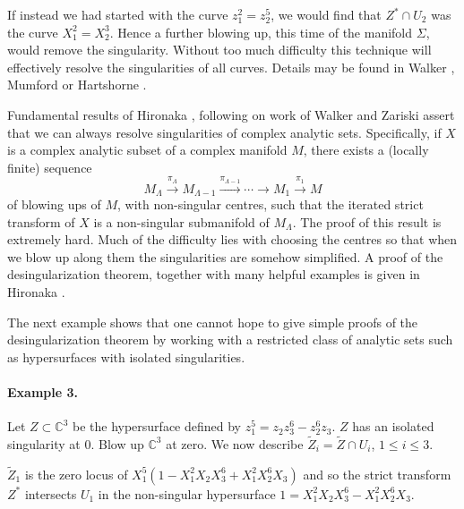 \begin{center}
    \begin{minipage}{\linewidth}
        \centering
        
    \end{minipage}
\end{center}

If instead we had started with the curve $z_1^2=z_2^5$, we would find that $Z^*\cap U_2$ was the curve $X_1^2=X_2^3$. Hence a further blowing up, this time of the manifold $\Sigma$, would remove the singularity. Without too much difficulty this technique will effectively resolve the singularities of all curves. Details may be found in Walker \cite{bib:I:walker-r:1}, Mumford \cite{bib:I:mumford-d:1} or Hartshorne \cite{bib:I:hartshorne-r:2}.

Fundamental results of Hironaka \cite{bib:I:hironaka-h:1,bib:I:hironaka-h:2}, following on work of Walker and Zariski assert that we can always resolve singularities of complex analytic sets. Specifically, if $X$ is a complex analytic subset of a complex manifold $M$, there exists a (locally finite) sequence
\[
M_\Lambda\xrightarrow{\pi_\Lambda}M_{\Lambda-1}\xrightarrow{\pi_{\Lambda-1}}\cdots\longrightarrow M_1\xrightarrow{\pi_1}M
\]
of blowing ups of $M$, with non-singular centres, such that the iterated strict transform of $X$ is a non-singular submanifold of $M_\Lambda$. The proof of this result is extremely hard. Much of the difficulty lies with choosing the centres so that when we blow up along them the singularities are somehow simplified. A proof of the desingularization theorem, together with many helpful examples is given in Hironaka \cite{bib:I:hironaka-h:2}.

The next example shows that one cannot hope to give simple proofs of the desingularization theorem by working with a restricted class of analytic sets such as hypersurfaces with isolated singularities.

\paragraph*{Example 3.} Let $Z\subset\mathbb C^3$ be the hypersurface defined by $z_1^5=z_2z_3^6-z_2^6z_3$. $Z$ has an isolated singularity at 0. Blow up $\mathbb C^3$ at zero. We now describe $\widetilde Z_i=\widetilde Z\cap U_i$, $1\leq i\leq3$.

$\widetilde Z_1$ is the zero locus of $X_1^5(1-X_1^2X_2X_3^6+X_1^2X_2^6X_3)$ and so the strict transform $Z^*$ intersects $U_1$ in the non-singular hypersurface $1=X_1^2X_2X_3^6-X_1^2X_2^6X_3$.

